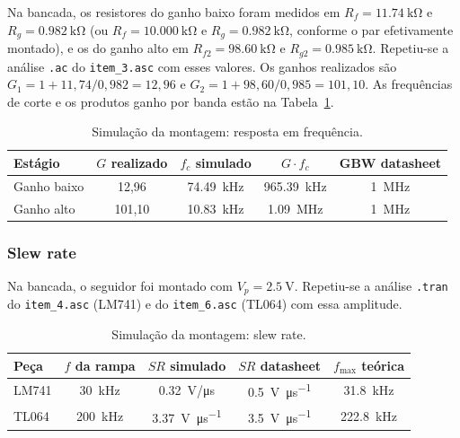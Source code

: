 \documentclass[11pt,a4paper]{article}
\begin{document}
Na bancada, os resistores do ganho baixo foram medidos em $R_f = \SI{11,74}{\kilo\ohm}$ e $R_g = \SI{0,982}{\kilo\ohm}$ (ou $R_f = \SI{10,000}{\kilo\ohm}$ e $R_g = \SI{0,982}{\kilo\ohm}$, conforme o par efetivamente montado), e os do ganho alto em $R_{f2} = \SI{98,60}{\kilo\ohm}$ e $R_{g2} = \SI{0,985}{\kilo\ohm}$. Repetiu-se a análise \texttt{.ac} do \texttt{item\_3.asc} com esses valores. Os ganhos realizados são $G_1 = 1 + 11{,}74/0{,}982 = 12{,}96$ e $G_2 = 1 + 98{,}60/0{,}985 = 101{,}10$. As frequências de corte e os produtos ganho por banda estão na Tabela~\ref{tab:fc_sim_bancada}.

\begin{table}[h]
\centering
\caption{Simulação da montagem: resposta em frequência.}
\label{tab:fc_sim_bancada}
\begin{tabular}{lcccc}
\hline
Estágio & $G$ realizado & $f_c$ simulado & $G \cdot f_c$ & GBW datasheet \\
\hline
Ganho baixo & 12,96 & \SI{74,49}{\kilo\hertz} & \SI{965,39}{\kilo\hertz} & \SI{1}{\mega\hertz} \\
Ganho alto & 101,10 & \SI{10,83}{\kilo\hertz} & \SI{1,09}{\mega\hertz} & \SI{1}{\mega\hertz} \\
\hline
\end{tabular}
\end{table}

\subsubsection{Slew rate}

Na bancada, o seguidor foi montado com $V_p = \SI{2,5}{\volt}$. Repetiu-se a análise \texttt{.tran} do \texttt{item\_4.asc} (LM741) e do \texttt{item\_6.asc} (TL064) com essa amplitude.

\begin{table}[h]
\centering
\caption{Simulação da montagem: slew rate.}
\label{tab:sr_sim_bancada}
\begin{tabular}{lcccc}
\hline
Peça & $f$ da rampa & $SR$ simulado & $SR$ datasheet & $f_{\max}$ teórica \\
\hline
LM741 & \SI{30}{\kilo\hertz} & \SI{0,32}{\volt / \micro\second} & \SI{0,5}{\volt\per\micro\second} & \SI{31,8}{\kilo\hertz} \\
TL064 & \SI{200}{\kilo\hertz} & \SI{3,37}{\volt\per\micro\second} & \SI{3,5}{\volt\per\micro\second} & \SI{222,8}{\kilo\hertz} \\
\hline
\end{tabular}
\end{table}
\end{document}
